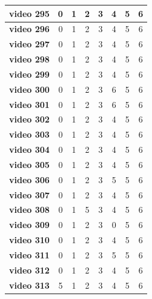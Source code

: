 \begin{table}[]
\begin{tabular}{c|c|c|c|c|c|c|c|}
\multicolumn{1}{|c|}{\textbf{video 295}} & 0 & 1 & 2 & 3 & 4 & 5 & 6 \\ \hline
\multicolumn{1}{|c|}{\textbf{video 296}} & 0 & 1 & 2 & 3 & 4 & 5 & 6 \\ \hline
\multicolumn{1}{|c|}{\textbf{video 297}} & 0 & 1 & 2 & 3 & 4 & 5 & 6 \\ \hline
\multicolumn{1}{|c|}{\textbf{video 298}} & 0 & 1 & 2 & 3 & 4 & 5 & 6 \\ \hline
\multicolumn{1}{|c|}{\textbf{video 299}} & 0 & 1 & 2 & 3 & 4 & 5 & 6 \\ \hline
\multicolumn{1}{|c|}{\textbf{video 300}} & 0 & 1 & 2 & 3 & 6 & 5 & 6 \\ \hline
\multicolumn{1}{|c|}{\textbf{video 301}} & 0 & 1 & 2 & 3 & 6 & 5 & 6 \\ \hline
\multicolumn{1}{|c|}{\textbf{video 302}} & 0 & 1 & 2 & 3 & 4 & 5 & 6 \\ \hline
\multicolumn{1}{|c|}{\textbf{video 303}} & 0 & 1 & 2 & 3 & 4 & 5 & 6 \\ \hline
\multicolumn{1}{|c|}{\textbf{video 304}} & 0 & 1 & 2 & 3 & 4 & 5 & 6 \\ \hline
\multicolumn{1}{|c|}{\textbf{video 305}} & 0 & 1 & 2 & 3 & 4 & 5 & 6 \\ \hline
\multicolumn{1}{|c|}{\textbf{video 306}} & 0 & 1 & 2 & 3 & 5 & 5 & 6 \\ \hline
\multicolumn{1}{|c|}{\textbf{video 307}} & 0 & 1 & 2 & 3 & 4 & 5 & 6 \\ \hline
\multicolumn{1}{|c|}{\textbf{video 308}} & 0 & 1 & 5 & 3 & 4 & 5 & 6 \\ \hline
\multicolumn{1}{|c|}{\textbf{video 309}} & 0 & 1 & 2 & 3 & 0 & 5 & 6 \\ \hline
\multicolumn{1}{|c|}{\textbf{video 310}} & 0 & 1 & 2 & 3 & 4 & 5 & 6 \\ \hline
\multicolumn{1}{|c|}{\textbf{video 311}} & 0 & 1 & 2 & 3 & 5 & 5 & 6 \\ \hline
\multicolumn{1}{|c|}{\textbf{video 312}} & 0 & 1 & 2 & 3 & 4 & 5 & 6 \\ \hline
\multicolumn{1}{|c|}{\textbf{video 313}} & 5 & 1 & 2 & 3 & 4 & 5 & 6 \\ \hline
\end{tabular}
\end{table}

